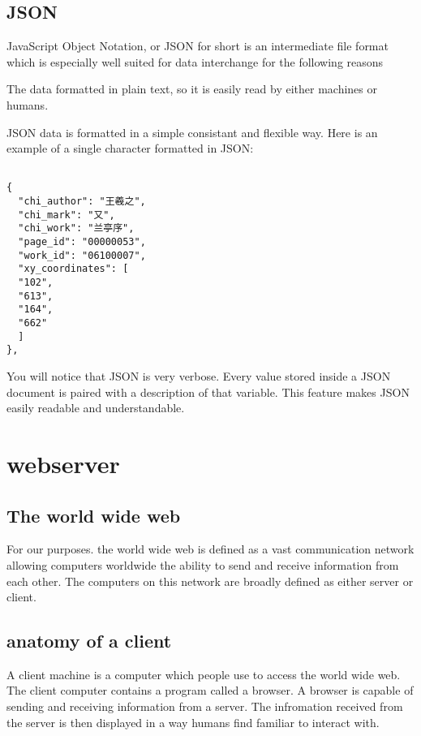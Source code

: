 \subsection{JSON}

JavaScript Object Notation, or JSON for short is an intermediate file format which is especially well suited for data interchange for the following reasons

The data formatted in plain text, so it is easily read by either machines or humans.

JSON data is formatted in a simple consistant and flexible way.  Here is an example of a single character formatted in JSON:

\begin{verbatim}
    
{
  "chi_author": "王羲之",
  "chi_mark": "又",
  "chi_work": "兰亭序",
  "page_id": "00000053",
  "work_id": "06100007",
  "xy_coordinates": [
  "102",
  "613",
  "164",
  "662"
  ]
},
\end{verbatim}


You will notice that JSON is very verbose.  Every value stored inside a JSON document is paired with a description of that variable.  This feature makes JSON easily readable and understandable.



\section{webserver}

\subsection{The world wide web}

For our purposes. the world wide web is defined as a vast communication network allowing computers worldwide the ability to send and receive information from each other.  The computers on this network are broadly defined as either server or client.

\subsection{anatomy of a client}

A client machine is a computer which people use to access the world wide web.  The client computer contains a program called a browser.  A browser is capable of sending and receiving information from a server.  The infromation received from the server is then displayed in a way humans find familiar to interact with.

